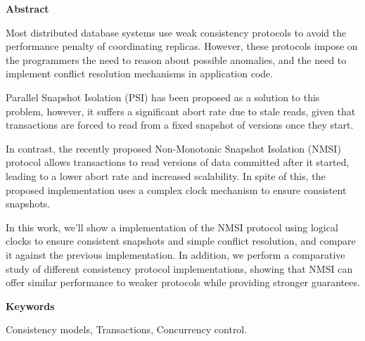 \newpage

\begin{center}
{\bf \Huge Abstract}
\end{center}

\vspace{1cm}


Most distributed database systems use weak consistency protocols to avoid the
performance penalty of coordinating replicas. However, these protocols impose
on the programmers the need to reason about possible anomalies, and the need
to implement conflict resolution mechanisms in application code.

Parallel Snapshot Isolation (PSI) has been proposed as a solution to this
problem, however, it suffers a significant abort rate due to stale reads,
given that transactions are forced to read from a fixed snapshot of versions
once they start.

In contrast, the recently proposed Non-Monotonic Snapshot Isolation (NMSI)
protocol allows transactions to read versions of data committed after it
started, leading to a lower abort rate and increased scalability. In spite
of this, the proposed implementation uses a complex clock mechanism to ensure
consistent snapshots.

In this work, we'll show a implementation of the NMSI protocol using logical
clocks to ensure consistent snapshots and simple conflict resolution, and
compare it against the previous implementation. In addition, we perform a
comparative study of different consistency protocol implementations, showing
that NMSI can offer similar performance to weaker protocols while providing
stronger guarantees.

\vspace{1cm}

\begin{center}
{\bf \Large Keywords}
\end{center}

\vspace{0.5cm}

Consistency models, Transactions, Concurrency control.
